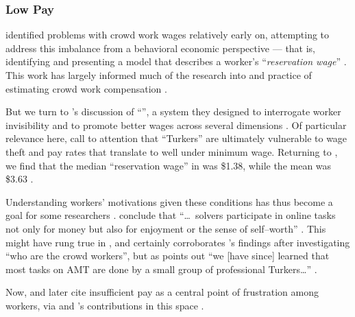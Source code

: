 \documentclass[trackingWork]{subfiles}
\begin{document}
{    \subsubsection{Low Pay}


    \citeauthor{laborEconomicsOfCrowdsourcingHorton}
    identified problems with crowd work wages relatively early on,      attempting to address this imbalance from a behavioral economic perspective ---
    that is, identifying and presenting a model that describes a worker's
    ``\textit{reservation wage}''
    \cite{laborEconomicsOfCrowdsourcingHorton}.
    This work has largely informed much of the research into and practice of estimating crowd work compensation
    \cite{incentivesShaw,paolacci2010running}.

    But we turn to \citeauthor{turkopticon}'s discussion of ``\TO'',      a system they designed to interrogate worker invisibility and to promote better wages across several dimensions
    \cite{turkopticon}.
    Of particular relevance here,      \citeauthor{turkopticon} call to attention that ``Turkers'' are ultimately vulnerable to
    wage theft and
    pay rates that translate to well under minimum wage.
    Returning to \citeauthor{laborEconomicsOfCrowdsourcingHorton},      we find that the median ``reservation wage'' in \citeyear{laborEconomicsOfCrowdsourcingHorton}
    was \$1.38, while the mean was \$3.63
    \cite{laborEconomicsOfCrowdsourcingHorton}.

    Understanding workers' motivations given these conditions has thus become a goal for some researchers
    \cite{whyWouldAnyoneBrewer}.
    \citeauthor{Sun20111033} conclude that
    ``\dots~solvers participate in online tasks
    not only for money
    but also for enjoyment
    or the sense of self--worth''
    \cite{Sun20111033}.
    This might have rung true in \citeyear{Sun20111033},      and certainly corroborates \citeauthor{Ross}'s findings after investigating
    ``who are the crowd workers'',      but as \citeauthor{whoareNOTtheTurkers} points out
    ``we [have since] learned that most tasks on AMT are done by a small group of professional Turkers\dots''
    \cite{Ross,whoareNOTtheTurkers}.

    Now, \citeauthor{turkopticon}
    and later
    \citeauthor{dynamo} cite insufficient pay as a central point of frustration among workers,      via \citeauthor{irani2015cultural} and \citeauthor{dawnDigitalSweatshopCushing}'s contributions in this space
    \cite{dynamo,irani2015cultural,dawnDigitalSweatshopCushing,turkopticon}.

}
\end{document}
